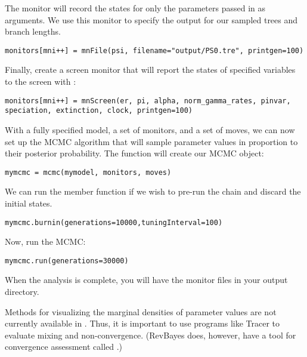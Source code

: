 The  monitor will record the states for only the parameters passed in as arguments. We use this monitor to specify the output for our sampled trees and branch lengths.

{\tt \begin{snugshade*}
\begin{lstlisting}
monitors[mni++] = mnFile(psi, filename="output/PS0.tre", printgen=100)
\end{lstlisting}
\end{snugshade*}}

Finally, create a screen monitor that will report the states of specified variables to the screen with :
{\tt \begin{snugshade*}
\begin{lstlisting}
monitors[mni++] = mnScreen(er, pi, alpha, norm_gamma_rates, pinvar, speciation, extinction, clock, printgen=100)
\end{lstlisting}
\end{snugshade*}}

With a fully specified model, a set of monitors, and a set of moves, we can now set up the MCMC algorithm that will sample parameter values in proportion to their posterior probability. The  function will create our MCMC object:
{\tt \begin{snugshade*}
\begin{lstlisting}
mymcmc = mcmc(mymodel, monitors, moves)
\end{lstlisting}
\end{snugshade*}}

We can run the  member function if we wish to pre-run the chain and discard the initial states. 
{\tt \begin{snugshade*}
\begin{lstlisting}
mymcmc.burnin(generations=10000,tuningInterval=100)
\end{lstlisting}
\end{snugshade*}}


Now, run the MCMC:
{\tt \begin{snugshade*}
\begin{lstlisting}
mymcmc.run(generations=30000)
\end{lstlisting}
\end{snugshade*}}

When the analysis is complete, you will have the monitor files in your output directory.

Methods for visualizing the marginal densities of parameter values are not currently available in \RevBayes. Thus, it is important to use programs like Tracer \citep{rambaut09} to evaluate mixing and non-convergence. (RevBayes does, however, have a tool for convergence assessment called .)

